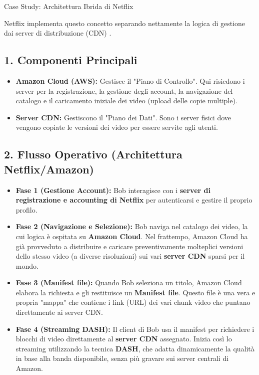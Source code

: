 \documentclass[a4paper,12pt]{report}
\begin{document}
\begin{esempiobox}{Case Study: Architettura Ibrida di Netflix}

Netflix implementa questo concetto separando nettamente la logica di gestione dai server di distribuzione (CDN) .

\subsection*{1. Componenti Principali}
\begin{itemize}
    \item \textbf{Amazon Cloud (AWS):} Gestisce il "Piano di Controllo". Qui risiedono i server per la registrazione, la gestione degli account, la navigazione del catalogo e il caricamento iniziale dei video (upload delle copie multiple).
    \item \textbf{Server CDN:} Gestiscono il "Piano dei Dati". Sono i server fisici dove vengono copiate le versioni dei video per essere servite agli utenti.
\end{itemize}

\subsection*{2. Flusso Operativo (Architettura Netflix/Amazon)}
\begin{itemize}[leftmargin=*]
    \item \textbf{Fase 1 (Gestione Account):} Bob interagisce con i \textbf{server di registrazione e accounting di Netflix} per autenticarsi e gestire il proprio profilo.
    \item \textbf{Fase 2 (Navigazione e Selezione):} Bob naviga nel catalogo dei video, la cui logica è ospitata su \textbf{Amazon Cloud}. Nel frattempo, Amazon Cloud ha già provveduto a distribuire e caricare preventivamente molteplici versioni dello stesso video (a diverse risoluzioni) sui vari \textbf{server CDN} sparsi per il mondo.
    \item \textbf{Fase 3 (Manifest file):} Quando Bob seleziona un titolo, Amazon Cloud elabora la richiesta e gli restituisce un \textbf{Manifest file}. Questo file è una vera e propria "mappa" che contiene i link (URL) dei vari chunk video che puntano direttamente ai server CDN.
    \item \textbf{Fase 4 (Streaming DASH):} Il client di Bob usa il manifest per richiedere i blocchi di video direttamente al \textbf{server CDN} assegnato. Inizia così lo streaming utilizzando la tecnica \textbf{DASH}, che adatta dinamicamente la qualità in base alla banda disponibile, senza più gravare sui server centrali di Amazon.
\end{itemize}

\end{esempiobox}
\end{document}
